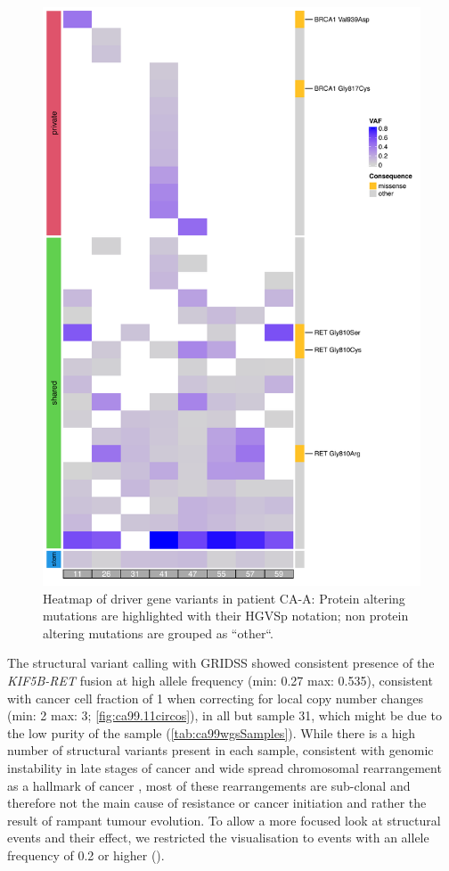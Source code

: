 \begin{figure}[ht]
\centering
\includegraphics[width=.99\linewidth]{Figures/CASCADE/CA99/CA99varHeatmap.pdf}
\caption[Heatmap of driver gene variants in patient CA-A]{Heatmap of driver gene variants in patient CA-A: Protein altering mutations are highlighted with their HGVSp notation; non protein altering mutations are grouped as ``other``.} \label{fig:cas99heatmap}
\end{figure}



The structural variant calling with GRIDSS showed consistent presence of the \textit{KIF5B-RET} fusion at high allele frequency (min: 0.27 max: 0.535), consistent with cancer cell fraction of 1 when correcting for local copy number changes  (min: 2 max: 3; \autoref{fig:ca99.11circos}), in all but sample 31, which might be due to the low purity of the sample (\autoref{tab:ca99wgsSamples}). While there is a high number of structural variants present in each sample, consistent with genomic instability in late stages of cancer \cite{Gerstung2020} and wide spread chromosomal rearrangement as a hallmark of cancer \cite{Hanahan2022}, most of these rearrangements are sub-clonal and therefore not the main cause of resistance or cancer initiation and rather the result of rampant tumour evolution. To allow a more focused look at structural events and their effect, we restricted the visualisation to events with an allele frequency of 0.2 or higher ().

